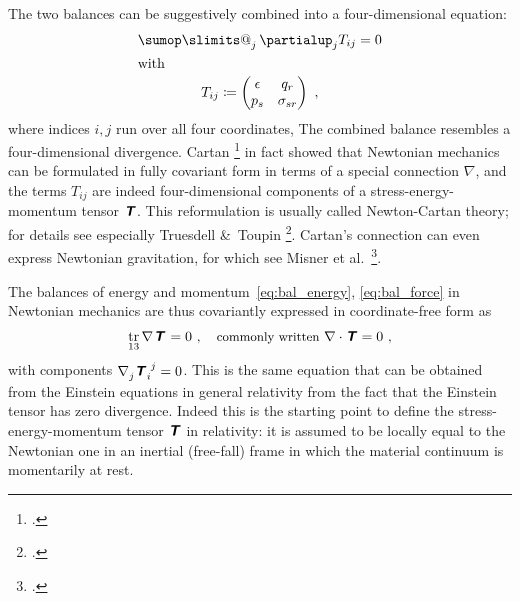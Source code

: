 \documentclass[\ifafour a4paper,12pt,\else a5paper,10pt,\fi%
onecolumn,oneside,article,%
british%
]{memoir}
\makeatletter
\theoremstyle{remark}
\theoremstyle{innote}
\def\sum{\DOTSI\sumop\slimits@}
\newcommand*{\mathte}[1]{\textbf{\textit{\textsf{#1}}}}
\newcommand*{\citep}{\footcites}
\newcommand*{\amp}{\&}
\newcommand*{\de}{\partialup}%
\DeclareMathOperator{\tr}{tr}%
\newcommand*{\defd}{\coloneqq}
\renewcommand*{\|}[1][]{\nonscript\,#1\vert\nonscript\;\mathopen{}}
\newcommand*{\sect}{\S}%
\newcommand*{\sects}{\S\S}%
\newcommand*{\chap}{ch.}%
\newcommand*{\etal}{{et al.}}
\newcommand*{\tsum}{\mathop{\textstyle\sum}\nolimits}
\newcommand*{\q}{}%
\DeclareRobustCommand*{\q}{%
  \mathbin{\mathpalette\bigcdot@{}}%
}
\newcommand*{\bigcdot@scalefactor}{0.7}
\newcommand*{\bigcdot@widthfactor}{1.5}
\newcommand*{\bigcdot@}[2]{%
  \sbox0{$#1\vcenter{}$}%
  \sbox2{$#1\cdot\m@th$}%
  \hbox to \bigcdot@widthfactor\wd2{%
    \hfil
    \raise\ht0\hbox{%
      \scalebox{\bigcdot@scalefactor}{%
        \lower\ht0\hbox{$#1\bullet\m@th$}%
      }%
    }%
    \hfil
  }%
}
\newcommand*{\yT}{\mathte{T}}
\renewcommand*{\i}{\indices}
\newcommand*{\nab}{\nabla}
\newcommand*{\en}{\epsilon}
\newcommand*{\yq}{q}
\newcommand*{\yp}{p}
\newcommand*{\yt}{\sigma}
\makeatother
\begin{document}
The two balances can be suggestively combined into a four-dimensional
equation:
\begin{gather}
  \label{eq:bal_energy-force}
  \tsum_{j}\de_{j} T_{ij} = 0
  \\
  \shortintertext{with}
  \label{eq:T}
  T_{ij} \defd 
  \begin{pmatrix}
    \en & \yq_{r} \\ \yp_{s} & \yt_{sr}
  \end{pmatrix} \ ,
\end{gather}
where indices $i,j$ run over all four coordinates, The combined balance
resembles a four-dimensional divergence. Cartan \citep{cartan1923} in fact
showed that Newtonian mechanics can be formulated in fully covariant form
in terms of a special connection $\nab$, and the terms $T_{ij}$ are indeed
four-dimensional components of a stress-energy-momentum tensor $\yT$. This
reformulation is usually called Newton-Cartan theory; for details see
especially Truesdell \amp\ Toupin \citep[\sects~152--154, 203--205, 238,
285--289]{truesdelletal1960}[see also][\sect~2.4]{marsdenetal1983b_r1994}.
Cartan's connection can even express Newtonian gravitation, for which see
Misner \etal\ \citep[\chap~12]{misneretal1970_r1973}[also][]{trautman1964}.

The balances of energy and momentum~\eqref{eq:bal_energy},
\eqref{eq:bal_force} in Newtonian mechanics are thus covariantly expressed
in coordinate-free form as
\begin{equation}
  \label{eq:div_T_cov}
  \tr_{13}\nab\i{_{\q}}\yT\i{_{\q}^{\q}} = 0 \ ,
  \quad\text{\small commonly written}\ \nab\cdot\yT=0 \ ,
\end{equation}
with components $\nab\i{_{j}}\yT\i{_{i}^{j}} = 0$. This is the same
equation that can be obtained from the Einstein equations in general
relativity from the fact that the Einstein tensor has zero divergence.
Indeed this is the starting point to define the stress-energy-momentum
tensor $\yT$ in relativity: it is assumed to be locally equal to the
Newtonian one in an inertial (free-fall) frame in which the material
continuum is momentarily at rest.
\end{document}
